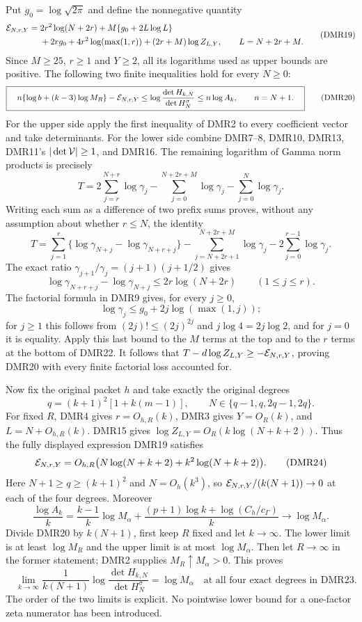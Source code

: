 \documentclass[11pt,a4paper]{article}
\begin{document}
Put $g_0=\log\sqrt{2\pi}$ and define the nonnegative quantity
\[
 \begin{split}
 {\cal E}_{N,r,Y}={}&2r^2\log(N+2r)
     +M\{g_0+2L\log L\}\\
     &+2rg_0+4r^2\log(\max(1,r))
       +(2r+M)\log Z_{L,Y},
             \qquad L=N+2r+M.
 \end{split}\tag{DMR19}
\]
Since $M\geq25$, $r\geq1$ and $Y\geq2$, all its logarithms
used as upper bounds are positive. The following two finite
inequalities hold for every $N\geq0$:
\[
 \boxed{\quad
 n\{\log b+(k-3)\log M_R\}-{\cal E}_{N,r,Y}
 \leq
       \log\frac{\det H_{k,N}}{\det H_N^\sigma}
 \leq n\log A_k,\qquad n=N+1.
 \quad}\tag{DMR20}
\]
For the upper side apply the first inequality of DMR2 to every
coefficient vector and take determinants.
For the lower side combine DMR7--8, DMR10, DMR13,
DMR11's $|\det{\cal V}|\geq1$, and DMR16. The remaining
logarithm of Gamma norm products is precisely
\[
 T=2\sum_{j=r}^{N+r}\log\gamma_j
          -\sum_{j=0}^{N+2r+M}\log\gamma_j
          -\sum_{j=0}^N\log\gamma_j .
 \tag{DMR21}
\]
Writing each sum as a difference of two prefix sums proves,
without any assumption about whether $r\leq N$, the identity
\[
 T=\sum_{j=1}^r
      \{\log\gamma_{N+j}-\log\gamma_{N+r+j}\}
       -\sum_{j=N+2r+1}^{N+2r+M}\log\gamma_j
       -2\sum_{j=0}^{r-1}\log\gamma_j .
 \tag{DMR22}
\]
The exact ratio
$\gamma_{j+1}/\gamma_j=(j+1)(j+1/2)$ gives
\[
 \log\gamma_{N+r+j}-\log\gamma_{N+j}
 \leq2r\log(N+2r)\qquad(1\leq j\leq r).
\]
The factorial formula in DMR9 gives, for every $j\geq0$,
\[
 \log\gamma_j\leq g_0+2j\log(\max(1,j));
\]
for $j\geq1$ this follows from $(2j)!\leq(2j)^{2j}$ and
$j\log4=2j\log2$, and for $j=0$ it is equality.
Apply this last bound to the $M$ terms at the top and to
the $r$ terms at the bottom of DMR22. It follows that
$T-d\log Z_{L,Y}\geq-{\cal E}_{N,r,Y}$, proving DMR20
with every finite factorial loss accounted for.

Now fix the original packet $h$ and take exactly the original
degrees
\[
 q=(k+1)^2[1+k(m-1)],\qquad
 N\in\{q-1,q,2q-1,2q\}.
 \tag{DMR23}
\]
For fixed $R$, DMR4 gives $r=O_{h,R}(k)$, DMR3 gives
$Y=O_R(k)$, and $L=N+O_{h,R}(k)$. DMR15 gives
$\log Z_{L,Y}=O_R(k\log(N+k+2))$. Thus the fully displayed
expression DMR19 satisfies
\[
 {\cal E}_{N,r,Y}
     =O_{h,R}\bigl(N\log(N+k+2)+k^2\log(N+k+2)\bigr).
 \tag{DMR24}
\]
Here $N+1\geq q\geq(k+1)^2$ and $N=O_h(k^3)$, so
$ {\cal E}_{N,r,Y}/(k(N+1))\to0$ at each of the four degrees.
Moreover
\[
 \frac{\log A_k}{k}
  =\frac{k-1}{k}\log M_\alpha
      +\frac{(p+1)\log k+\log(C_h/c_\Gamma)}{k}
       \longrightarrow\log M_\alpha .
 \tag{DMR25}
\]
Divide DMR20 by $k(N+1)$, first keep $R$ fixed and let
$k\to\infty$. The lower limit is at least $\log M_R$ and
the upper limit is at most $\log M_\alpha$. Then let
$R\to\infty$ in the former statement; DMR2 supplies
$M_R\uparrow M_\alpha>0$. This proves
\[
 \boxed{\quad
 \lim_{k\to\infty}
  \frac{1}{k(N+1)}
       \log\frac{\det H_{k,N}}{\det H_N^\sigma}
       =\log M_\alpha
   \quad\text{at all four exact degrees in DMR23}.
 \quad}\tag{DMR26}
\]
The order of the two limits is explicit. No pointwise lower
bound for a one-factor zeta numerator has been introduced.
\end{document}

